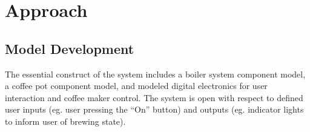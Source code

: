 \documentclass[10pt]{article}
\begin{document}
\section{Approach}
\subsection{Model Development}
The essential construct of the system includes a boiler system component model, a coffee pot component model, and modeled digital electronics for user interaction and coffee maker control.  The system is open with respect to defined user inputs (eg. user pressing the ``On'' button) and outputs (eg. indicator lights to inform user of brewing state).



\end{document}
